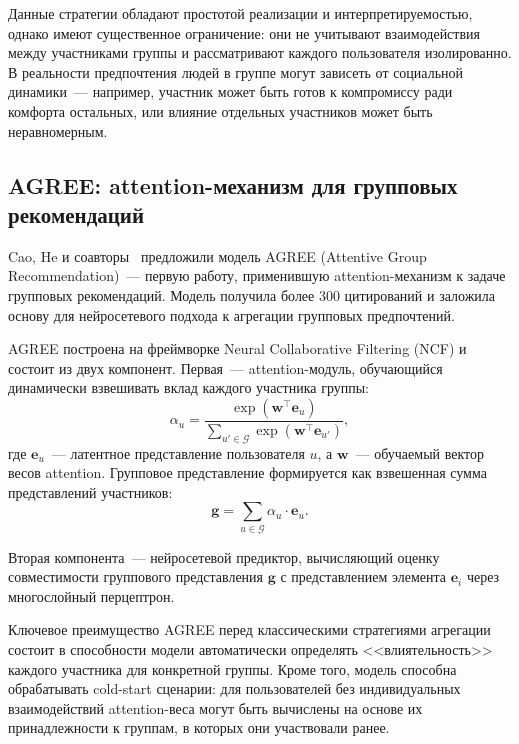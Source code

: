 Данные стратегии обладают простотой реализации и интерпретируемостью, однако имеют существенное ограничение: они не учитывают взаимодействия между участниками группы и рассматривают каждого пользователя изолированно. В реальности предпочтения людей в группе могут зависеть от социальной динамики~--- например, участник может быть готов к компромиссу ради комфорта остальных, или влияние отдельных участников может быть неравномерным.

\subsection{AGREE: attention-механизм для групповых рекомендаций}

Cao, He и соавторы~\cite{cao2018agree} предложили модель AGREE (Attentive Group Recommendation)~--- первую работу, применившую attention-механизм к задаче групповых рекомендаций. Модель получила более 300 цитирований и заложила основу для нейросетевого подхода к агрегации групповых предпочтений.

AGREE построена на фреймворке Neural Collaborative Filtering (NCF) и состоит из двух компонент. Первая~--- attention-модуль, обучающийся динамически взвешивать вклад каждого участника группы:
\begin{equation}
    \alpha_u = \frac{\exp(\mathbf{w}^\top \mathbf{e}_u)}{\sum_{u' \in \mathcal{G}} \exp(\mathbf{w}^\top \mathbf{e}_{u'})},
\end{equation}
где $\mathbf{e}_u$~--- латентное представление пользователя $u$, а $\mathbf{w}$~--- обучаемый вектор весов attention. Групповое представление формируется как взвешенная сумма представлений участников:
\begin{equation}
    \mathbf{g} = \sum_{u \in \mathcal{G}} \alpha_u \cdot \mathbf{e}_u.
\end{equation}

Вторая компонента~--- нейросетевой предиктор, вычисляющий оценку совместимости группового представления $\mathbf{g}$ с представлением элемента $\mathbf{e}_i$ через многослойный перцептрон.

Ключевое преимущество AGREE перед классическими стратегиями агрегации состоит в способности модели автоматически определять <<влиятельность>> каждого участника для конкретной группы. Кроме того, модель способна обрабатывать cold-start сценарии: для пользователей без индивидуальных взаимодействий attention-веса могут быть вычислены на основе их принадлежности к группам, в которых они участвовали ранее.

